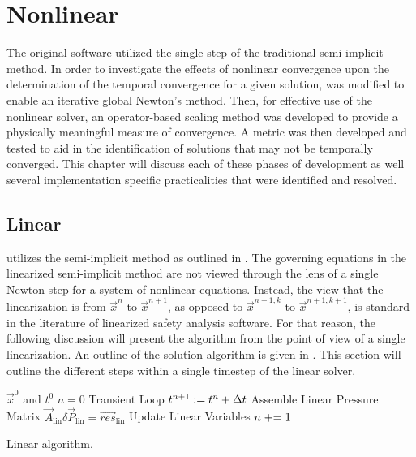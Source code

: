 \chapter{Nonlinear \cobra{}}
\label{chap:nonlinear}
The original \cobra{} software utilized the single step of the traditional semi-implicit method.
In order to investigate the effects of nonlinear convergence upon the determination of the temporal convergence for a given solution, \cobra{} was modified to enable an iterative global Newton's method.
Then, for effective use of the nonlinear solver, an operator-based scaling method was developed to provide a physically meaningful measure of convergence.
A metric was then developed and tested to aid in the identification of solutions that may not be temporally converged.
This chapter will discuss each of these phases of development as well several implementation specific practicalities that were identified and resolved.

\section{Linear \cobra{}}
\label{sect:linCobraAlg}

\cobra{} utilizes the semi-implicit method as outlined in .
The governing equations in the linearized semi-implicit method are not viewed through the lens of a single Newton step for a system of nonlinear equations.
Instead, the view that the linearization is from $\vec{x}^{n}$ to $\vec{x}^{n+1}$, as opposed to $\vec{x}^{n+1, k}$ to $\vec{x}^{n+1, k+1}$, is standard in the literature of linearized safety analysis software.
For that reason, the following discussion will present the algorithm from the point of view of a single linearization.
An outline of the solution algorithm is given in .
This section will outline the different steps within a single timestep of the linear solver.

\begin{algo}[ht!]
\setlength{\baselineskip}{0.625\baselineskip}
\begin{algorithmic}[1]
\Require $\vec{x}^{0}$ and $t^{0}$
\Set $n = 0$
\Loop \; Transient Loop
    \Set $t^{n+1} : = t^{n} + \dt{}$
	\Algorithm Assemble Linear Pressure Matrix 
   	\Solve $\vec{A}_{\text{lin}} \delta \vec{P}_{\text{lin}} = \vec{res}_{\text{lin}}$
	\Algorithm Update Linear Variables 
	\Set $n \mathrel{+}= 1$
\EndLoop
\end{algorithmic}
\caption{Linear \cobra{} algorithm.}
\label{alg:linCobraAlgorithm}
\end{algo}

